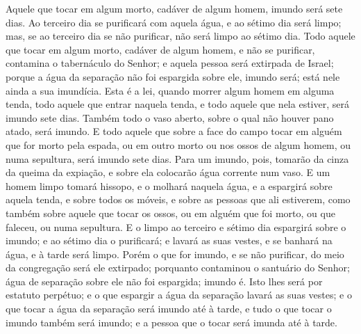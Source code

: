 Aquele que tocar em algum morto, cadáver de algum homem, imundo
será sete dias. Ao terceiro dia se purificará com aquela
água, e ao sétimo dia será limpo; mas, se ao terceiro dia se não
purificar, não será limpo ao sétimo dia. Todo aquele que
tocar em algum morto, cadáver de algum homem, e não se purificar,
contamina o tabernáculo do Senhor; e aquela pessoa será extirpada de
Israel; porque a água da separação não foi espargida sobre ele,
imundo será; está nele ainda a sua imundícia. Esta é a lei,
quando morrer algum homem em alguma tenda, todo aquele que entrar
naquela tenda, e todo aquele que nela estiver, será imundo sete
dias. Também todo o vaso aberto, sobre o qual não houver pano
atado, será imundo. E todo aquele que sobre a face do campo
tocar em alguém que for morto pela espada, ou em outro morto ou nos
ossos de algum homem, ou numa sepultura, será imundo sete dias.
Para um imundo, pois, tomarão da cinza da queima da expiação,
e sobre ela colocarão água corrente num vaso. E um homem
limpo tomará hissopo, e o molhará naquela água, e a espargirá sobre
aquela tenda, e sobre todos os móveis, e sobre as pessoas que ali
estiverem, como também sobre aquele que tocar os ossos, ou em alguém
que foi morto, ou que faleceu, ou numa sepultura. E o limpo
ao terceiro e sétimo dia espargirá sobre o imundo; e ao sétimo dia o
purificará; e lavará as suas vestes, e se banhará na água, e à tarde
será limpo. Porém o que for imundo, e se não purificar, do
meio da congregação será ele extirpado; porquanto contaminou o
santuário do Senhor; água de separação sobre ele não foi espargida;
imundo é. Isto lhes será por estatuto perpétuo; e o que
espargir a água da separação lavará as suas vestes; e o que tocar a
água da separação será imundo até à tarde, e tudo o que tocar
o imundo também será imundo; e a pessoa que o tocar será imunda até
à tarde.

\medskip

